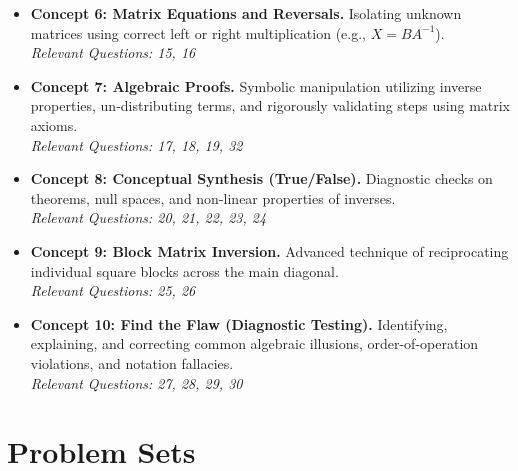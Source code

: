 \documentclass{article}
\begin{document}
\begin{itemize}
    \item \textbf{Concept 6: Matrix Equations and Reversals.} Isolating unknown matrices using correct left or right multiplication (e.g., $X = B A^{-1}$). \\
    \textit{Relevant Questions: 15, 16}
    
    \item \textbf{Concept 7: Algebraic Proofs.} Symbolic manipulation utilizing inverse properties, un-distributing terms, and rigorously validating steps using matrix axioms. \\
    \textit{Relevant Questions: 17, 18, 19, 32}
    
    \item \textbf{Concept 8: Conceptual Synthesis (True/False).} Diagnostic checks on theorems, null spaces, and non-linear properties of inverses. \\
    \textit{Relevant Questions: 20, 21, 22, 23, 24}
    
    \item \textbf{Concept 9: Block Matrix Inversion.} Advanced technique of reciprocating individual square blocks across the main diagonal. \\
    \textit{Relevant Questions: 25, 26}
    
    \item \textbf{Concept 10: Find the Flaw (Diagnostic Testing).} Identifying, explaining, and correcting common algebraic illusions, order-of-operation violations, and notation fallacies. \\
    \textit{Relevant Questions: 27, 28, 29, 30}
\end{itemize}

\newpage

\section{Problem Sets}
\end{document}

